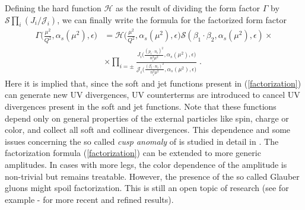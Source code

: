 \documentclass[%
 reprint,
 amsmath,amssymb,
 aps,
]{revtex4-1}
\begin{document}
Defining the hard function $\mathcal{H}$ as the result of dividing the form factor $\Gamma$ by $\mathcal{S}\prod_i(J_i/\mathcal{J}_i)$, we can finally write the formula for the factorized form factor
\begin{align}
\Gamma\Big(\frac{\mu^2}{Q^2},\alpha_s(\mu^2),\epsilon\Big)&=\mathcal{H}	\Big(\frac{\mu^2}{Q^2},\alpha_s(\mu^2),\epsilon\Big)\mathcal{S}(\beta_1\cdot \beta_2,\alpha_s(\mu^2),\epsilon)\times\nonumber\\ &\times \prod_{i=\pm}\frac{J_i\Big(\frac{(p_i\cdot n_i)^2}{n_i^2\mu^2},\alpha_s(\mu^2),\epsilon\Big)}{\mathcal{J}_i\Big(\frac{(\beta_i\cdot n_i)^2}{n_i^2\mu^2},\alpha_s(\mu^2),\epsilon\Big)}\;.\label{factorization}
\end{align}
Here it is implied that, since the soft and jet functions present in (\ref{factorization}) can generate new UV divergences, UV counterterms are introduced to cancel UV divergences present in the soft and jet functions.  Note that these functions depend only on general properties of the external particles like spin, charge or color, and collect all soft and collinear divergences. This dependence and some issues concerning the so called \textit{cusp anomaly} of is studied in detail in \cite{DGM}. %
The factorization formula (\ref{factorization}) can be extended to more generic amplitudes. In cases with more legs, the color dependence of the amplitude is non-trivial but remains treatable. However, the presence of the so called Glauber gluons might spoil factorization. This is still an open topic of research (see for example \cite{CFR}-\cite{FSS} for more recent and refined results).
\end{document}
